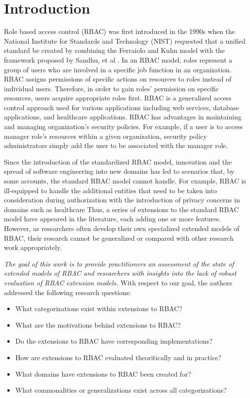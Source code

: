 \section{Introduction} \label{sec:introduction}

Role based access control (RBAC) was first introduced in the 1990s when the National Institute for Standards and Technology (NIST) requested that a unified standard be created by combining the Ferraiolo and Kuhn model \cite{ferraiolokuhn} with the framework proposed by Sandhu, et al \cite{sandhu1996role}.  In an RBAC model, roles represent a group of users who are involved in a specific job function in an organization. RBAC assigns permissions of specific actions on resources to roles instead of individual users.  Therefore, in order to gain roles' permission on specific resources, users acquire appropriate roles first.  RBAC is a generalized access control approach used for various applications including web services, database applications, and healthcare applications.  RBAC has advantages in maintaining and managing organization's security policies.  For example, if a user is to access manager role's resources within a given organization, security policy administrators simply add the user to be associated with the manager role.

Since the introduction of the standardized RBAC model, innovation and the spread of software engineering into new domains has led to scenarios that, by some accounts, the standard RBAC model cannot handle.  For example, RBAC is ill-equipped to handle the additional entities that need to be taken into consideration during authorization with the introduction of privacy concerns in domains such as healthcare  Thus, a series of extensions to the standard RBAC model have appeared in the literature, each adding one or more features.  However, as researchers often develop their own specialized extended models of RBAC, their research cannot be generalized or compared with other research work appropriately.

\textit{The goal of this work is to provide practitioners an assessment of the state of extended models of RBAC and researchers with insights into the lack of robust evaluation of RBAC extension models.} With respect to our goal, the authors addressed the following research questions:

\begin{itemize}
\item What categorizations exist within extensions to RBAC?
\item What are the motivations behind extensions to RBAC?
\item Do the extensions to RBAC have corresponding implementations?
\item How are extensions to RBAC evaluated theoritically and in practice?
\item What domains have extensions to RBAC been created for?
\item What commonalities or generalizations exist across all categorizations?
\end{itemize}

